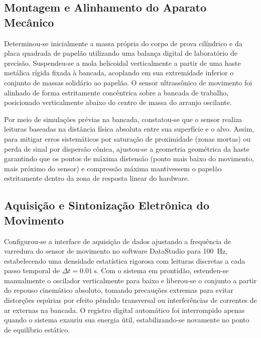 \documentclass[12pt, a4paper]{article}
\begin{document}
\subsection{Montagem e Alinhamento do Aparato Mecânico}
Determinou-se inicialmente a massa própria do corpo de prova cilíndrico e da placa quadrada de papelão utilizando uma balança digital de laboratório de precisão. Suspendeu-se a mola helicoidal verticalmente a partir de uma haste metálica rígida fixada à bancada, acoplando em sua extremidade inferior o conjunto de massas solidário ao papelão. O sensor ultrassônico de movimento foi alinhado de forma estritamente concêntrica sobre a bancada de trabalho, posicionado verticalmente abaixo do centro de massa do arranjo oscilante.

Por meio de simulações prévias na bancada, constatou-se que o sensor realiza leituras baseadas na distância física absoluta entre sua superfície e o alvo. Assim, para mitigar erros sistemáticos por saturação de proximidade (zonas mortas) ou perda de sinal por dispersão cônica, ajustou-se a geometria geométrica da haste garantindo que os pontos de máxima distensão (ponto mais baixo do movimento, mais próximo do sensor) e compressão máxima mantivessem o papelão estritamente dentro da zona de resposta linear do hardware.


\subsection{Aquisição e Sintonização Eletrônica do Movimento}
Configurou-se a interface de aquisição de dados ajustando a frequência de varredura do sensor de movimento no software DataStudio para \SI{100}{\hertz}, estabelecendo uma densidade estatística rigorosa com leituras discretas a cada passo temporal de $\Delta t = \SI{0,01}{\second}$. Com o sistema em prontidão, estendeu-se manualmente o oscilador verticalmente para baixo e liberou-se o conjunto a partir do repouso cinemático absoluto, tomando precauções extremas para evitar distorções espúrias por efeito pêndulo transversal ou interferências de correntes de ar externas na bancada. O registro digital automático foi interrompido apenas quando o sistema exauriu sua energia útil, estabilizando-se novamente no ponto de equilíbrio estático.
\end{document}
